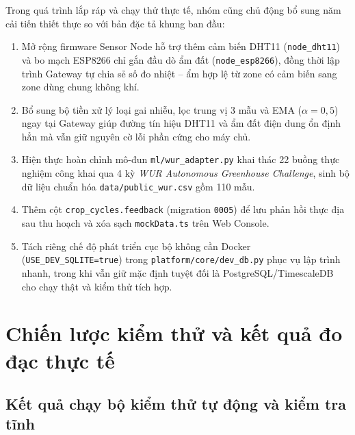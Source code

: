 Trong quá trình lắp ráp và chạy thử thực tế, nhóm cũng chủ động bổ sung năm cải tiến thiết thực so với bản đặc tả khung ban đầu:
\begin{enumerate}[leftmargin=*]
    \item Mở rộng firmware Sensor Node hỗ trợ thêm cảm biến DHT11 (\texttt{node\_dht11}) và bo mạch ESP8266 chỉ gắn đầu dò ẩm đất (\texttt{node\_esp8266}), đồng thời lập trình Gateway tự chia sẻ số đo nhiệt -- ẩm hợp lệ từ zone có cảm biến sang zone dùng chung không khí.
    \item Bổ sung bộ tiền xử lý loại gai nhiễu, lọc trung vị 3 mẫu và EMA (\(\alpha = 0{,}5\)) ngay tại Gateway giúp đường tín hiệu DHT11 và ẩm đất điện dung ổn định hẳn mà vẫn giữ nguyên cờ lỗi phần cứng cho máy chủ.
    \item Hiện thực hoàn chỉnh mô-đun \texttt{ml/wur\_adapter.py} khai thác 22 buồng thực nghiệm công khai qua 4 kỳ \textit{WUR Autonomous Greenhouse Challenge}, sinh bộ dữ liệu chuẩn hóa \texttt{data/public\_wur.csv} gồm 110 mẫu.
    \item Thêm cột \texttt{crop\_cycles.feedback} (migration \texttt{0005}) để lưu phản hồi thực địa sau thu hoạch và xóa sạch \texttt{mockData.ts} trên Web Console.
    \item Tách riêng chế độ phát triển cục bộ không cần Docker (\texttt{USE\_DEV\_SQLITE=true}) trong \texttt{platform/core/dev\_db.py} phục vụ lập trình nhanh, trong khi vẫn giữ mặc định tuyệt đối là PostgreSQL/TimescaleDB cho chạy thật và kiểm thử tích hợp.
\end{enumerate}

\section{Chiến lược kiểm thử và kết quả đo đạc thực tế}
\label{sec:c4-testing}

\subsection{Kết quả chạy bộ kiểm thử tự động và kiểm tra tĩnh}
\label{subsec:c4-unit-tests}

